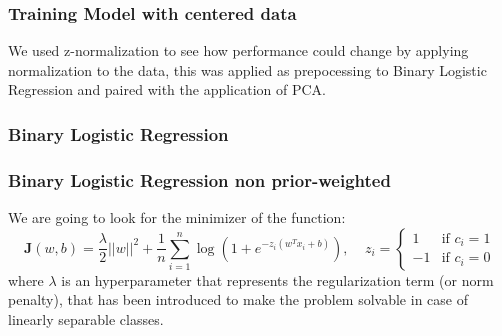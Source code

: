 \documentclass{article}
\begin{document}
\subsubsection*{Training Model with centered data}
We used z-normalization to see how performance could change by applying normalization to the data, this was applied as prepocessing to Binary Logistic Regression and paired with the application of PCA.
\subsubsection{Binary Logistic Regression}
\subsubsection*{Binary Logistic Regression non prior-weighted}
We are going to look for the minimizer of the function:
\begin{equation}
    \mathbf{J}(w,b)=\frac{\lambda}{2} ||w||^2 + \frac{1}{n} \sum_{i=1}^{n} \log({1+e^{-z_i(w^Tx_i+b)}}),\;\;\;\;
        z_i = 
        \begin{cases} 
          1 & \text{if } c_i=1 \\
          -1 & \text{if } c_i=0
        \end{cases}
\end{equation}
where \(\lambda\)  is an hyperparameter that represents the regularization term (or norm penalty), that has been introduced to make the problem solvable in case of linearly separable classes.\\
\\
\end{document}
